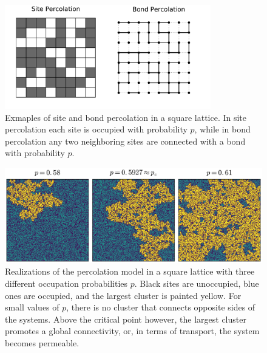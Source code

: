 \begin{figure}
\begin{center}
    \includegraphics[width=0.8\textwidth]{chapters/ch2-crit/figs/sitebond}
\end{center}
\caption{Exmaples of site and bond percolation in a square lattice.
    In site percolation each site is occupied with probability $p$, while
    in bond percolation any two neighboring sites are connected with a bond
    with probability $p$.}
\label{fig:sitebond}
\end{figure}

\begin{figure}
\begin{center}
    \includegraphics[width=\textwidth]{chapters/ch2-crit/figs/isoperco}
\end{center}
\caption{Realizations of the percolation model in a square lattice with three
    different occupation probabilities $p$. Black sites are unoccupied, blue
    ones are occupied, and the largest cluster is painted yellow. For small
    values of $p$, there is no cluster that connects opposite sides of the
    systems. Above the critical point however, the largest cluster promotes a
    global connectivity, or, in terms of transport, the system becomes
    permeable.}
\label{fig:isoperco}
\end{figure}

